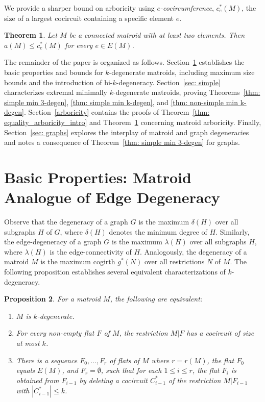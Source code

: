 \documentclass{amsart}
\newtheorem{theorem}{Theorem}[section]
\newtheorem{proposition}[theorem]{Proposition}
\theoremstyle{definition}
\theoremstyle{remark}
\numberwithin{equation}{section}
\begin{document}
We provide a sharper bound on arboricity using \emph{$e$-cocircumference}, $c^*_e(M)$, the size of a largest cocircuit containing a specific element $e$.

\begin{theorem}
\label{e-circumference_intro}
Let $M$ be a connected matroid with at least two elements. Then $a(M) \leq c^*_e(M)$ for every $e \in E(M)$. 
\end{theorem}

The remainder of the paper is organized as follows. Section~\ref{sec: basic_prop} establishes the basic properties and bounds for $k$-degenerate matroids, including maximum size bounds and the introduction of bi-$k$-degeneracy. Section~\ref{sec: simple} characterizes extremal minimally $k$-degenerate matroids, proving Theorems~\ref{thm: simple min 3-degen}, \ref{thm: simple min k-degen}, and \ref{thm: non-simple min k-degen}. Section~\ref{arboricity} contains the proofs of Theorem~\ref{thm: equality_arboricity_intro} and Theorem~\ref{e-circumference_intro} concerning matroid arboricity. Finally, Section~\ref{sec: graphs} explores the interplay of matroid and graph degeneracies and notes a consequence of Theorem~\ref{thm: simple min 3-degen} for graphs.

\section{Basic Properties: Matroid Analogue of Edge Degeneracy}\label{sec: basic_prop}

Observe that the degeneracy of a graph $G$ is the maximum $\delta(H)$ over all subgraphs $H$ of $G$, where $\delta(H)$ denotes the minimum degree of $H$.
Similarly, the edge-degeneracy of a graph $G$ is the maximum $\lambda(H)$ over all subgraphs $H$, where $\lambda(H)$ is the edge-connectivity of $H$. Analogously, the degeneracy of a matroid $M$ is the maximum cogirth $g^*(N)$ over all restrictions $N$ of $M$. The following proposition establishes several equivalent characterizations of $k$-degeneracy. 


\begin{proposition}
\label{matroid_equivalence}
For a matroid $M$, the following are equivalent:
\begin{enumerate}[label=(\roman*)]
    \item $M$ is $k$-degenerate.
    \item For every non-empty flat $F$ of $M$, the restriction $M|F$ has a cocircuit of size at most $k$. 
    \item There is a sequence $F_0, \ldots, F_r$ of flats of $M$ where $r = r(M)$, the flat $F_0$ equals $E(M)$, and $F_r = \emptyset$, such that for each $1 \leq i \leq r$, the flat $F_i$ is obtained from $F_{i-1}$ by deleting a cocircuit $C^*_{i-1}$ of the restriction $M|F_{i-1}$ with $|C^*_{i-1}| \leq k$.
\end{enumerate}
\end{proposition}
\end{document}
